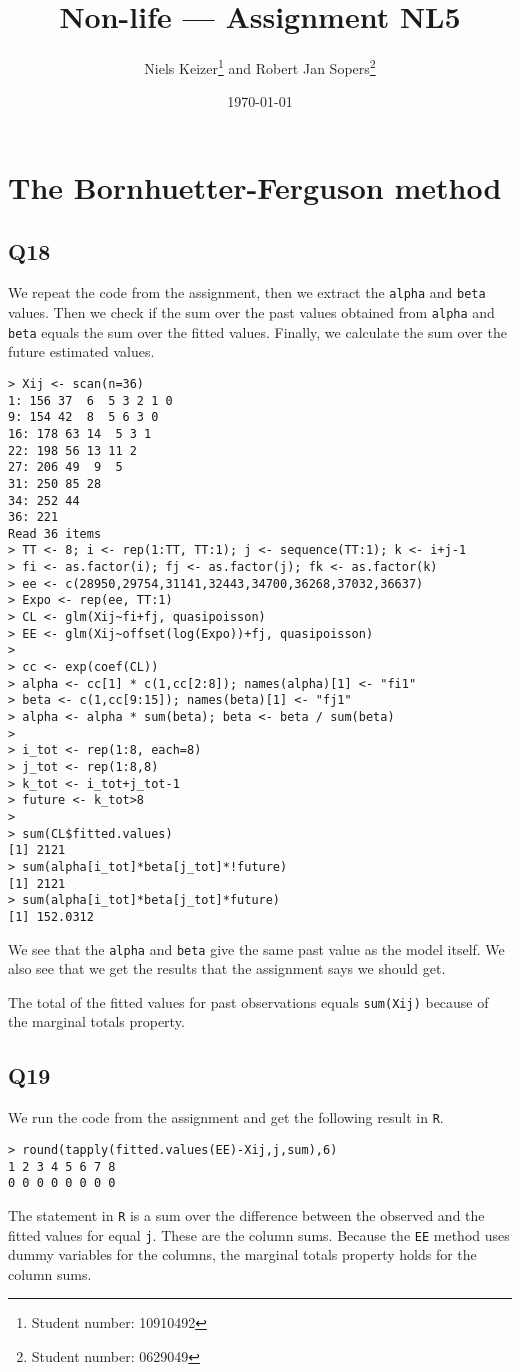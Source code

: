 \documentclass[11pt]{article}
\title{Non-life --- Assignment NL5}  %
\author{
  Niels Keizer\footnote{Student number: 10910492}
  \quad and \quad
  Robert Jan Sopers\footnote{Student number: 0629049}
}
\date{\today}
\begin{document}
\maketitle


\section{The Bornhuetter-Ferguson method}

\subsection*{Q18}

We repeat the code from the assignment, then we extract the \verb|alpha| and \verb|beta| values. Then we check if the sum over the past values obtained from \verb|alpha| and \verb|beta| equals the sum over the fitted values. Finally, we calculate the sum over the future estimated values.

\begin{verbatim}
> Xij <- scan(n=36)
1: 156 37  6  5 3 2 1 0
9: 154 42  8  5 6 3 0
16: 178 63 14  5 3 1
22: 198 56 13 11 2
27: 206 49  9  5
31: 250 85 28
34: 252 44
36: 221
Read 36 items
> TT <- 8; i <- rep(1:TT, TT:1); j <- sequence(TT:1); k <- i+j-1
> fi <- as.factor(i); fj <- as.factor(j); fk <- as.factor(k)
> ee <- c(28950,29754,31141,32443,34700,36268,37032,36637)
> Expo <- rep(ee, TT:1)
> CL <- glm(Xij~fi+fj, quasipoisson)
> EE <- glm(Xij~offset(log(Expo))+fj, quasipoisson)
> 
> cc <- exp(coef(CL))
> alpha <- cc[1] * c(1,cc[2:8]); names(alpha)[1] <- "fi1"
> beta <- c(1,cc[9:15]); names(beta)[1] <- "fj1"
> alpha <- alpha * sum(beta); beta <- beta / sum(beta)
> 
> i_tot <- rep(1:8, each=8)
> j_tot <- rep(1:8,8)
> k_tot <- i_tot+j_tot-1
> future <- k_tot>8
> 
> sum(CL$fitted.values)
[1] 2121
> sum(alpha[i_tot]*beta[j_tot]*!future)
[1] 2121
> sum(alpha[i_tot]*beta[j_tot]*future)
[1] 152.0312
\end{verbatim}

We see that the \verb|alpha| and \verb|beta| give the same past value as the model itself. We also see that we get the results that the assignment says we should get.

The total of the fitted values for past observations equals \verb|sum(Xij)| because of the marginal totals property.

\subsection*{Q19}

We run the code from the assignment and get the following result in \verb|R|.

\begin{verbatim}
> round(tapply(fitted.values(EE)-Xij,j,sum),6)
1 2 3 4 5 6 7 8 
0 0 0 0 0 0 0 0 
\end{verbatim}

The statement in \verb|R| is a sum over the difference between the observed and the fitted values for equal \verb|j|. These are the column sums. Because the \verb|EE| method uses dummy variables for the columns, the marginal totals property holds for the column sums.
\end{document}
